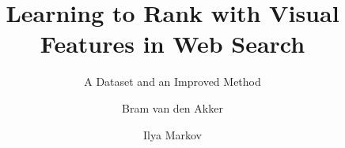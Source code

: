 \documentclass[sigconf]{acmart} %
\begin{document}
\newcommand{\datasetname}{\textit{PLACEHOLDER} }
\title{Learning to Rank with Visual Features in Web Search}
\subtitle{A Dataset and an Improved Method}


\author{Bram van den Akker}

\author{Ilya Markov}



\renewcommand{\shortauthors}{B. van den Akker et al.}
\newcommand{\todo}[1]{\textcolor{red}{TODO: #1}}


\begin{abstract}
\end{abstract}

%
%
\end{document}
